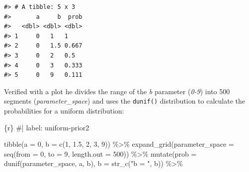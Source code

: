 \documentclass[
  letterpaper,
  DIV=11,
  numbers=noendperiod]{scrreprt}
\newenvironment{Shaded}{\begin{snugshade}}{\end{snugshade}}
\newcommand{\AttributeTok}[1]{\textcolor[rgb]{0.40,0.45,0.13}{#1}}
\newcommand{\CommentTok}[1]{\textcolor[rgb]{0.37,0.37,0.37}{#1}}
\newcommand{\DecValTok}[1]{\textcolor[rgb]{0.68,0.00,0.00}{#1}}
\newcommand{\FloatTok}[1]{\textcolor[rgb]{0.68,0.00,0.00}{#1}}
\newcommand{\FunctionTok}[1]{\textcolor[rgb]{0.28,0.35,0.67}{#1}}
\newcommand{\InformationTok}[1]{\textcolor[rgb]{0.37,0.37,0.37}{#1}}
\newcommand{\NormalTok}[1]{\textcolor[rgb]{0.00,0.23,0.31}{#1}}
\newcommand{\SpecialCharTok}[1]{\textcolor[rgb]{0.37,0.37,0.37}{#1}}
\newcommand{\StringTok}[1]{\textcolor[rgb]{0.13,0.47,0.30}{#1}}
\begin{document}
\begin{verbatim}
#> # A tibble: 5 x 3
#>       a     b  prob
#>   <dbl> <dbl> <dbl>
#> 1     0   1   1    
#> 2     0   1.5 0.667
#> 3     0   2   0.5  
#> 4     0   3   0.333
#> 5     0   9   0.111
\end{verbatim}

Verified with a plot he divides the range of the \emph{b} parameter
(\emph{0-9}) into 500 segments (\emph{parameter\_space}) and uses the
\texttt{dunif()} distribution to calculate the probabilities for a
uniform distribution:

\begin{Shaded}
\begin{Highlighting}[]
\InformationTok{\textasciigrave{}\textasciigrave{}\textasciigrave{}\{r\}}
\CommentTok{\#| label: uniform{-}prior2}

\FunctionTok{tibble}\NormalTok{(}\AttributeTok{a =} \DecValTok{0}\NormalTok{,}
       \AttributeTok{b =} \FunctionTok{c}\NormalTok{(}\DecValTok{1}\NormalTok{, }\FloatTok{1.5}\NormalTok{, }\DecValTok{2}\NormalTok{, }\DecValTok{3}\NormalTok{, }\DecValTok{9}\NormalTok{)) }\SpecialCharTok{\%\textgreater{}\%} 
  \FunctionTok{expand\_grid}\NormalTok{(}\AttributeTok{parameter\_space =} \FunctionTok{seq}\NormalTok{(}\AttributeTok{from =} \DecValTok{0}\NormalTok{, }\AttributeTok{to =} \DecValTok{9}\NormalTok{, }\AttributeTok{length.out =} \DecValTok{500}\NormalTok{)) }\SpecialCharTok{\%\textgreater{}\%} 
  \FunctionTok{mutate}\NormalTok{(}\AttributeTok{prob =} \FunctionTok{dunif}\NormalTok{(parameter\_space, a, b),}
         \AttributeTok{b    =} \FunctionTok{str\_c}\NormalTok{(}\StringTok{"b = "}\NormalTok{, b)) }\SpecialCharTok{\%\textgreater{}\%} 
  

\end{Highlighting}
\end{Shaded}
\end{document}
